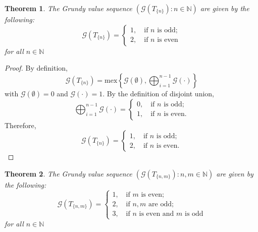 \documentclass[12pt]{elsarticle}
\newtheorem{theorem}{Theorem}[section]
\newtheorem*{theorem A}{Theorem A}
\newtheorem*{theorem B}{N\"olker's Theorem}
\theoremstyle{remark}
\theoremstyle{remark}
\theoremstyle{definition}
\begin{document}
\begin{theorem}
The Grundy value sequence $\left(\mathcal{G}\left(T_{\{n\}}\right) : n \in \mathbb{N}\right)$ are given by the following:
\begin{equation*}
	\mathcal{G}\left(T_{\{n\}}\right) = \begin{cases}
		1,	\quad \text{if $n$ is odd};\\
		2,	\quad \text{if $n$ is even}
	\end{cases}
\end{equation*}
for all $n \in \mathbb{N}$
\end{theorem}
\begin{proof}
	By definition,
	\begin{equation*}
		\mathcal{G}\left(T_{\{n\}}\right) = \mathrm{mex}\left\{\mathcal{G}\left(\emptyset\right), \bigoplus_{i=1}^{n-1}\mathcal{G}\left(\cdot\right)\right\}
	\end{equation*}
	with $\mathcal{G}\left(\emptyset\right) = 0$ and $\mathcal{G}\left(\cdot\right) = 1$. By the definition of disjoint union,
	\begin{equation*}
		\bigoplus_{i=1}^{n-1}\mathcal{G}\left(\cdot\right) = \begin{cases}
			0,	\quad \text{if $n$ is odd};\\
			1,	\quad \text{if $n$ is even}.
		\end{cases}
	\end{equation*}
	Therefore, 
	\begin{equation*}
		\mathcal{G}\left(T_{\{n\}}\right) = \begin{cases}
			1,	\quad \text{if $n$ is odd};\\
			2,	\quad \text{if $n$ is even.}
		\end{cases}
	\end{equation*}
\end{proof}
\begin{theorem}\label{Tnm}
	The Grundy value sequence $\left( \mathcal{G}\left(T_{\{n,m\}}\right) : n,m \in \mathbb{N} \right)$ are given by the following:
	\begin{equation*}
		\mathcal{G}\left(T_{\{n,m\}}\right) = \begin{cases}
			1,	\quad \text{if $m$ is even};\\
			2,	\quad \text{if $n,m$ are odd};\\
			3,	\quad \text{if $n$ is even and $m$ is odd}
		\end{cases}
	\end{equation*}
	for all $n \in \mathbb{N}$
\end{theorem}
\end{document}
